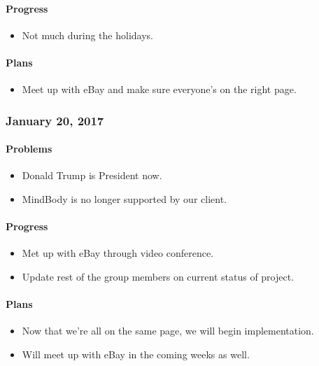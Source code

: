 \paragraph{Progress}\label{progress}
\begin{itemize}
\tightlist
\item
  Not much during the holidays.
\end{itemize}
\paragraph{Plans}\label{plans}
\begin{itemize}
\tightlist
\item
  Meet up with eBay and make sure everyone's on the right page.
\end{itemize}

\subsubsection{January 20, 2017}\label{section}
\paragraph{Problems}\label{problems}
\begin{itemize}
\tightlist
\item
  Donald Trump is President now.
\item
  MindBody is no longer supported by our client.
\end{itemize}
\paragraph{Progress}\label{progress}
\begin{itemize}
\tightlist
\item
  Met up with eBay through video conference.
\item
  Update rest of the group members on current status of project.
\end{itemize}
\paragraph{Plans}\label{plans}
\begin{itemize}
\tightlist
\item
  Now that we're all on the same page, we will begin implementation.
\item
  Will meet up with eBay in the coming weeks as well.
\end{itemize}

